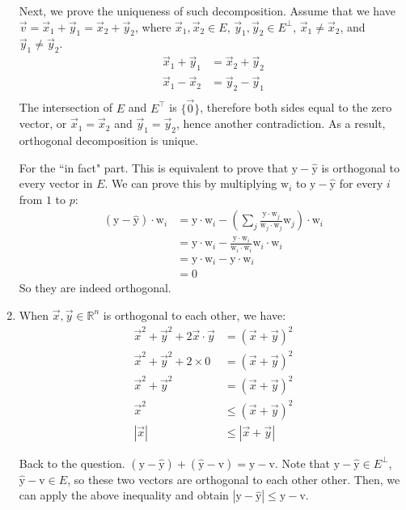 \documentclass{article}
\newcommand \vecb[1]{\boldsymbol{\mathrm{#1}}}
\begin{document}
\begin{enumerate}[1.]
Next, we prove the uniqueness of such decomposition. Assume that we have $\vec{v} = \vec{x}_1 + \vec{y}_1 = \vec{x}_2 + \vec{y}_2$, where $\vec{x}_1, \vec{x}_2 \in E$, $\vec{y}_1, \vec{y}_2 \in E^{\bot}$, $\vec{x}_1 \neq \vec{x}_2$, and $\vec{y}_1 \neq \vec{y}_2$.
$$
\begin{aligned}
\vec{x}_1 + \vec{y}_1 &= \vec{x}_2 + \vec{y}_2 \\
\vec{x}_1 - \vec{x}_2 &= \vec{y}_2 - \vec{y}_1 \\
\end{aligned}
$$
The intersection of $E$ and $E^{\top}$ is $\{\vec{0}\}$, therefore both sides equal to the zero vector, or $\vec{x}_1 = \vec{x}_2$ and $\vec{y}_1 = \vec{y}_2$, hence another contradiction. As a result, orthogonal decomposition is unique.

For the ``in fact" part. This is equivalent to prove that $\vecb{y} - \hat{\vecb{y}}$
is orthogonal to every vector in $E$. We can prove this by multiplying $\vecb{w}_i$ to
$\vecb{y} - \hat{\vecb{y}}$ for every $i$ from $1$ to $p$:
\begin{align*}
(\vecb{y} - \hat{\vecb{y}}) \cdot \vecb{w}_i
&= \vecb{y} \cdot \vecb{w}_i - (\sum_j \frac{\vecb{y}\cdot\vecb{w}_j}{\vecb{w}_j\cdot\vecb{w}_j}\vecb{w}_j) \cdot \vecb{w}_i \\
&= \vecb{y} \cdot \vecb{w}_i - \frac{\vecb{y}\cdot\vecb{w}_i}{\vecb{w}_i\cdot\vecb{w}_i} \vecb{w}_i \cdot \vecb{w}_i \\
&= \vecb{y} \cdot \vecb{w}_i - \vecb{y} \cdot \vecb{w}_i \\
&= 0
\end{align*}
So they are indeed orthogonal. \rQED

\item
When $\vec{x}, \vec{y} \in \mathbb{R}^n$ is orthogonal to each other, we have:
\begin{align*}
\vec{x}^2 + \vec{y}^2 + 2\vec{x}\cdot\vec{y} &= (\vec{x} + \vec{y})^2\\
\vec{x}^2 + \vec{y}^2 + 2 \times 0 &= (\vec{x} + \vec{y})^2\\
\vec{x}^2 + \vec{y}^2 &= (\vec{x} + \vec{y})^2 \\
\vec{x}^2 &\leq (\vec{x} + \vec{y})^2 \\
|\vec{x}| &\leq |\vec{x} + \vec{y}|
\end{align*}

Back to the question. $(\vecb{y} - \vecb{\hat{y}}) + (\vecb{\hat{y}} - \vecb{v}) = \vecb{y} - \vecb{v}$. Note that $\vecb{y} - \vecb{\hat{y}} \in E^{\bot}$, $\vecb{\hat{y}} - \vecb{v} \in E$, so these two vectors are orthogonal to each other other. Then, we can apply the above inequality and obtain $|\vecb{y} - \vecb{\hat{y}}| \leq \vecb{y} - \vecb{v}$. \rQED


\end{enumerate}
\end{document}
